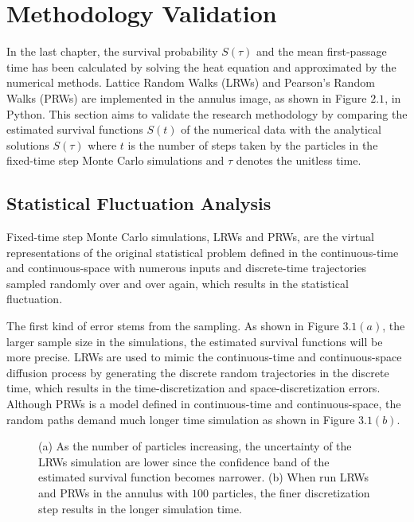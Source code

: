\section{Methodology Validation}

In the last chapter, the survival probability $S(\tau)$ and the mean
first-passage time has been calculated by solving the heat equation
and approximated by the numerical methods. Lattice Random Walks (LRWs)
and Pearson's Random Walks (PRWs) are implemented in the annulus
image, as shown in Figure $2.1$, in Python. This section aims to
validate the research methodology by comparing the estimated survival
functions $S(t)$ of the numerical data with the analytical solutions
$S(\tau)$ where $t$ is the number of steps taken by the particles in
the fixed-time step Monte Carlo simulations and $\tau$ denotes the
unitless time.


\subsection{Statistical Fluctuation Analysis}

Fixed-time step Monte Carlo simulations, LRWs and PRWs, are the
virtual representations of the original statistical problem defined in
the continuous-time and continuous-space with numerous inputs and
discrete-time trajectories sampled randomly over and over again, which
results in the statistical fluctuation. 

The first kind of error stems from the sampling. As shown in Figure
$3.1 (a)$, the larger sample size in the simulations, the estimated
survival functions will be more precise. LRWs are used to mimic the
continuous-time and continuous-space diffusion process by generating
the discrete random trajectories in the discrete time, which results
in the time-discretization and space-discretization errors. Although
PRWs is a model defined in continuous-time and continuous-space, the
random paths demand much longer time simulation as shown in Figure
$3.1 (b)$.

\clearpage

\begin{figure}[h!]
  \centering
  \caption{(a) As the number of particles increasing, the uncertainty
    of the LRWs simulation are lower since the confidence band of the
    estimated survival function becomes narrower. (b) When run LRWs
    and PRWs in the annulus with $100$ particles, the finer
    discretization step results in the longer simulation time. }
\end{figure}


